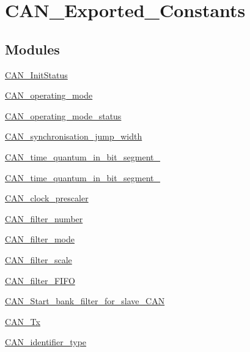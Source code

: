 \hypertarget{group___c_a_n___exported___constants}{}\section{C\+A\+N\+\_\+\+Exported\+\_\+\+Constants}
\label{group___c_a_n___exported___constants}
\subsection*{Modules}
\begin{DoxyCompactItemize}
\item 
\hyperlink{group___c_a_n___init_status}{C\+A\+N\+\_\+\+Init\+Status}
\item 
\hyperlink{group___c_a_n__operating__mode}{C\+A\+N\+\_\+operating\+\_\+mode}
\item 
\hyperlink{group___c_a_n__operating__mode__status}{C\+A\+N\+\_\+operating\+\_\+mode\+\_\+status}
\item 
\hyperlink{group___c_a_n__synchronisation__jump__width}{C\+A\+N\+\_\+synchronisation\+\_\+jump\+\_\+width}
\item 
\hyperlink{group___c_a_n__time__quantum__in__bit__segment__1}{C\+A\+N\+\_\+time\+\_\+quantum\+\_\+in\+\_\+bit\+\_\+segment\+\_}
\item 
\hyperlink{group___c_a_n__time__quantum__in__bit__segment__2}{C\+A\+N\+\_\+time\+\_\+quantum\+\_\+in\+\_\+bit\+\_\+segment\+\_}
\item 
\hyperlink{group___c_a_n__clock__prescaler}{C\+A\+N\+\_\+clock\+\_\+prescaler}
\item 
\hyperlink{group___c_a_n__filter__number}{C\+A\+N\+\_\+filter\+\_\+number}
\item 
\hyperlink{group___c_a_n__filter__mode}{C\+A\+N\+\_\+filter\+\_\+mode}
\item 
\hyperlink{group___c_a_n__filter__scale}{C\+A\+N\+\_\+filter\+\_\+scale}
\item 
\hyperlink{group___c_a_n__filter___f_i_f_o}{C\+A\+N\+\_\+filter\+\_\+\+F\+I\+F\+O}
\item 
\hyperlink{group___c_a_n___start__bank__filter__for__slave___c_a_n}{C\+A\+N\+\_\+\+Start\+\_\+bank\+\_\+filter\+\_\+for\+\_\+slave\+\_\+\+C\+A\+N}
\item 
\hyperlink{group___c_a_n___tx}{C\+A\+N\+\_\+\+Tx}
\item 
\hyperlink{group___c_a_n__identifier__type}{C\+A\+N\+\_\+identifier\+\_\+type}
\item 

\end{DoxyCompactItemize}
